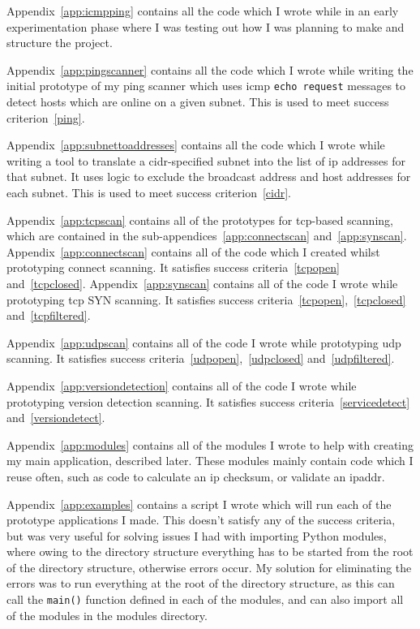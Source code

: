 \documentclass[titlepage]{article}
\begin{document}
Appendix~\ref{app:icmpping} contains all the code which I wrote while in an early experimentation
phase where I was testing out how I was planning to make and structure the project.

Appendix~\ref{app:pingscanner} contains all the code which I wrote while writing the initial prototype
of my ping scanner which uses \gls{icmp} \verb|echo request| messages to detect hosts which are online on a given
subnet.
This is used to meet success criterion~\ref{ping}.

Appendix~\ref{app:subnettoaddresses} contains all the code which I wrote while writing a tool to
translate a \gls{cidr}-specified subnet into the list of \gls{ip} addresses for that subnet.
It uses logic to exclude the broadcast address and host addresses for each subnet.
This is used to meet success criterion~\ref{cidr}.

Appendix~\ref{app:tcpscan} contains all of the prototypes for \gls{tcp}-based scanning,
which are contained in the sub-appendices~\ref{app:connectscan} and~\ref{app:synscan}.
Appendix~\ref{app:connectscan} contains all of the code which I created whilst prototyping connect scanning.
It satisfies success criteria~\ref{tcpopen} and~\ref{tcpclosed}.
Appendix~\ref{app:synscan} contains all of the code I wrote while prototyping \gls{tcp} SYN scanning.
It satisfies success criteria~\ref{tcpopen},~\ref{tcpclosed} and~\ref{tcpfiltered}.

Appendix~\ref{app:udpscan} contains all of the code I wrote while prototyping \gls{udp} scanning.
It satisfies success criteria~\ref{udpopen},~\ref{udpclosed} and~\ref{udpfiltered}.

Appendix~\ref{app:versiondetection} contains all of the code I wrote while prototyping version detection
scanning. It satisfies success criteria~\ref{servicedetect} and~\ref{versiondetect}.

Appendix~\ref{app:modules} contains all of the modules I wrote to help with creating my main application,
described later.
These modules mainly contain code which I reuse often,
such as code to calculate an ip checksum, or validate an \gls{ipaddr}.

Appendix~\ref{app:examples} contains a script I wrote which will run each of the prototype applications I made.
This doesn't satisfy any of the success criteria,
but was very useful for solving issues I had with importing Python modules,
where owing to the directory structure everything has to be started from the root of the directory structure,
otherwise errors occur.
My solution for eliminating the errors was to run everything at the root of the directory structure,
as this can call the \verb|main()| function defined in each of the modules,
and can also import all of the modules in the modules directory.
\end{document}
